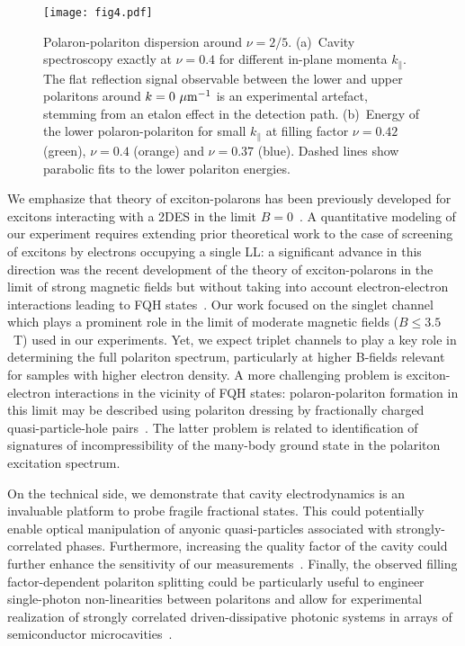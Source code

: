 \documentclass[prl,twocolumn,10pt,showpacs,superscriptaddress,longbibliography,footnoteinbib]{revtex4-1}
\begin{document}
\begin{figure}
\centering
\texttt{[image: fig4.pdf]}
\caption{Polaron-polariton dispersion around $\nu=2/5$. (a)~Cavity spectroscopy exactly at $\nu=0.4$ for different in-plane momenta $k_{\parallel}$. The flat reflection signal observable between the lower and upper polaritons around $k=0~{\rm \mu m}^{-1}$ is an experimental artefact, stemming from an etalon effect in the detection path. (b)~Energy of the lower polaron-polariton for small $k_{\parallel}$ at filling factor $\nu=0.42$ (green), $\nu=0.4$ (orange) and $\nu=0.37$ (blue). Dashed lines show parabolic fits to the lower polariton energies.}
\label{fig:Dispersion}
\end{figure}

We emphasize that theory of exciton-polarons has been previously developed for excitons interacting with a 2DES in the limit $B=0$~\cite{Sidler2017,Efimkin2016}. A quantitative modeling of our experiment requires extending prior theoretical work to the case of screening of excitons by electrons occupying a single LL: a significant advance in this direction was the recent development of the theory of exciton-polarons in the limit of strong magnetic fields but without taking into account electron-electron interactions leading to FQH states~\cite{Efimkin2017}. Our work focused on the singlet channel which plays a prominent role in the limit of moderate magnetic fields ($B \le 3.5$~T) used in our experiments. Yet, we expect triplet channels to play a key role in determining the full polariton spectrum, particularly at higher B-fields relevant for samples with higher electron density. A more challenging problem is exciton-electron interactions in the vicinity of FQH states: polaron-polariton formation in this limit may be described using polariton dressing by fractionally charged quasi-particle-hole pairs~\cite{Grusdt2016}. The latter problem is related to identification of signatures of incompressibility of the many-body ground state in the polariton excitation spectrum.

On the technical side, we demonstrate that cavity electrodynamics is an invaluable platform to probe fragile fractional states. This could potentially enable optical manipulation of anyonic quasi-particles associated with strongly-correlated phases. Furthermore, increasing the quality factor of the cavity could further enhance the sensitivity of our measurements~\cite{Steger2013}. Finally, the observed filling factor-dependent polariton splitting could be particularly useful to engineer single-photon non-linearities between polaritons and allow for experimental realization of strongly correlated driven-dissipative photonic systems in arrays of semiconductor microcavities~\cite{Amo2016}.
\end{document}
